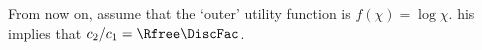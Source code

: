From now on, assume that the `outer' utility function is ${f}(\chi)  = \log \chi$.
his implies that $c_{2}/c_{1} = \Rfree\DiscFac$.

